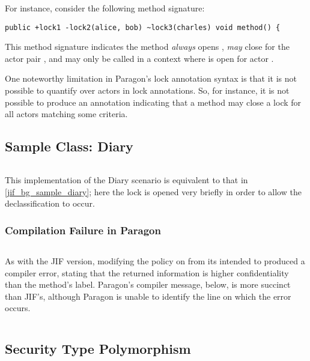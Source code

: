 For instance, consider the following method signature:

\begin{verbatim}
public +lock1 -lock2(alice, bob) ~lock3(charles) void method() {
\end{verbatim}

This method signature indicates the method \textit{always} opens , \textit{may} close  for the actor pair , and may only be called in a context where  is open for actor .

One noteworthy limitation in Paragon's lock annotation syntax is that it is not possible to quantify over actors in lock annotations. So, for instance, it is not possible to produce an annotation indicating that a method may close a lock for all actors matching some criteria.

\newpage

\subsection{Sample Class: Diary}

\inputminted{java}{content/code_sections/jif_para_bg/Diary.para}

This implementation of the Diary scenario is equivalent to that in \ref{jif_bg_sample_diary}; here the  lock is opened very briefly in order to allow the declassification to occur.

\subsubsection{Compilation Failure in Paragon}

\inputminted{java}{content/code_sections/jif_para_bg/DiaryError.para}

As with the JIF version, modifying the policy on  from its intended  to  produced a compiler error, stating that the returned information is higher confidentiality than the method's label. Paragon's compiler message, below, is more succinct than JIF's, although Paragon is unable to identify the line on which the error occurs.

\inputminted[fontsize=\footnotesize]{text}{content/code_sections/jif_para_bg/DiaryError_message_para.txt}

\subsection{Security Type Polymorphism} \label{para_generics}

